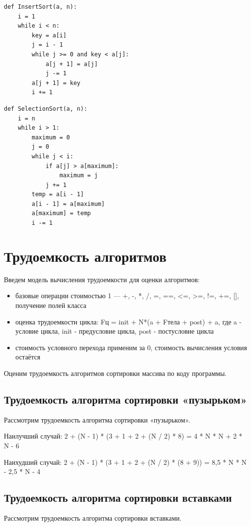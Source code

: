 \documentclass[12pt]{report}
\begin{document}
\begin{lstlisting}[label=some-code,caption=Сортировка массива вставками]
def InsertSort(a, n):
	i = 1
	while i < n:
		key = a[i]
		j = i - 1
		while j >= 0 and key < a[j]:
			a[j + 1] = a[j]
			j -= 1
		a[j + 1] = key
		i += 1
\end{lstlisting}

\newpage
\begin{lstlisting}[label=some-code,caption=Сортировка массива выбором]
def SelectionSort(a, n):
	i = n
	while i > 1:
		maximum = 0
		j = 0
		while j < i:
			if a[j] > a[maximum]:
				maximum = j
			j += 1
		temp = a[i - 1]
		a[i - 1] = a[maximum]
		a[maximum] = temp
		i -= 1
\end{lstlisting}

\newpage
\section{Трудоемкость алгоритмов}
Введем модель вычисления трудоемкости для оценки алгоритмов: 
\begin{itemize}
	\item базовые операции стоимостью 1 — +, -, *, /, =, ==, <=, >=, !=, +=, [], получение полей класса
	\item оценка трудоемкости цикла: Fц = init +  N*(a + Fтела + post) + a, где a - условие цикла, init - предусловие цикла, post - постусловие цикла
	\item стоимость условного перехода применим за 0, стоимость вычисления условия остаётся
\end{itemize}

Оценим трудоемкость алгоритмов сортировки массива по коду программы.

\subsection{Трудоемкость алгоритма сортировки «пузырьком»}
Рассмотрим трудоемкость алгоритма сортировки «пузырьком».\vspace{\baselineskip} 

Наилучший случай: 2 + (N - 1) * (3 + 1 + 2 + (N / 2) * 8) = 4 * N * N + 2 * N - 6

Наихудший случай: 2 + (N - 1) * (3 + 1 + 2 + (N / 2) * (8 + 9)) = 8,5 * N * N - 2,5 * N - 4

\subsection{Трудоемкость алгоритма сортировки вставками}
Рассмотрим трудоемкость алгоритма сортировки вставками.\vspace{\baselineskip} 
\end{document}
